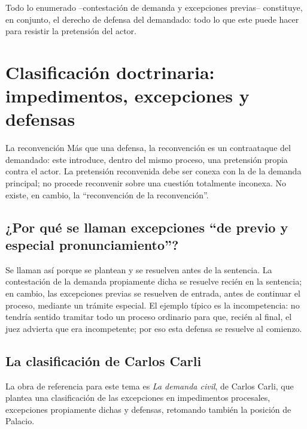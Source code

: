 \documentclass[12pt,oneside]{book}
\begin{document}
Todo lo enumerado --contestación de demanda y excepciones previas-- constituye, en conjunto, el derecho de defensa del demandado: todo lo que este puede hacer para resistir la pretensión del actor.

\section{Clasificación doctrinaria: impedimentos, excepciones y defensas}

\begin{definition}{La reconvención}
Más que una defensa, la reconvención es un contraataque del demandado: este introduce, dentro del mismo proceso, una pretensión propia contra el actor. La pretensión reconvenida debe ser conexa con la de la demanda principal; no procede reconvenir sobre una cuestión totalmente inconexa. No existe, en cambio, la ``reconvención de la reconvención''.
\end{definition}

\subsection*{¿Por qué se llaman excepciones ``de previo y especial pronunciamiento''?}

Se llaman así porque se plantean y se resuelven antes de la sentencia. La contestación de la demanda propiamente dicha se resuelve recién en la sentencia; en cambio, las excepciones previas se resuelven de entrada, antes de continuar el proceso, mediante un trámite especial. El ejemplo típico es la incompetencia: no tendría sentido tramitar todo un proceso ordinario para que, recién al final, el juez advierta que era incompetente; por eso esta defensa se resuelve al comienzo.

\subsection*{La clasificación de Carlos Carli}

La obra de referencia para este tema es \textit{La demanda civil}, de Carlos Carli, que plantea una clasificación de las excepciones en impedimentos procesales, excepciones propiamente dichas y defensas, retomando también la posición de Palacio.
\end{document}
